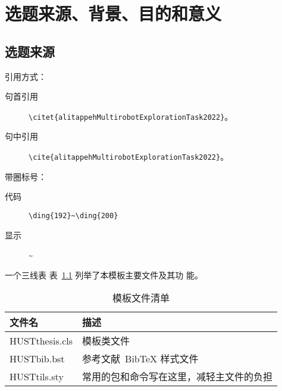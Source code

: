 \documentclass[draftformat,mathCMR]{HUSTthesis}
\begin{document}
\graphicspath{{figures/}}


\frontmatter

\makecover
\makeattention

\tableofcontents

% 

\mainmatter

\raggedbottom

%
%

\chapter{选题来源、背景、目的和意义}

\section{选题来源}
引用方式：\begin{description}
	\item[句首引用] \verb|\citet{alitappehMultirobotExplorationTask2022}|。\citet{alitappehMultirobotExplorationTask2022}
	\item[句中引用] \verb|\cite{alitappehMultirobotExplorationTask2022}|。\cite{alitappehMultirobotExplorationTask2022}
\end{description}

带圈标号：\begin{description}
	\item[代码] \verb|\ding{192}~\ding{200}|
	\item[显示] \~{} 
\end{description}


一个三线表
表~\ref{tab:template-files} 列举了本模板主要文件及其功
能。
\begin{table}[htb]
	\centering
	\caption{模板文件清单}
	\label{tab:template-files}
	\begin{minipage}[t]{0.8\linewidth} %
		\begin{tabular*}{\linewidth}{m{3cm}m{10cm}}
			\toprule[1.5pt]
			{\hei 文件名}  & {\hei 描述} \\\midrule[1pt]
			HUSTthesis.cls & 模板类文件\\
			HUSTbib.bst    & 参考文献~Bib\TeX{} 样式文件\\
			HUSTtils.sty   & 常用的包和命令写在这里，减轻主文件的负担\\
			\bottomrule[1.5pt]
		\end{tabular*}
	\end{minipage}
\end{table}
\end{document}
